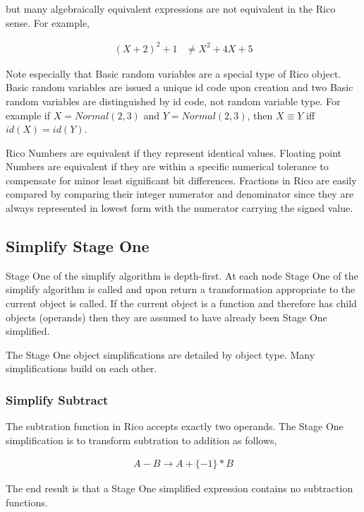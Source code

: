 but many algebraically equivalent expressions are not equivalent in the Rico sense. For example,

\begin{align*}
(X+2)^2 + 1 &\neq X^2 + 4X + 5
\end{align*}

Note especially that Basic random variables are a special type of Rico object. Basic random variables are issued a unique id code upon creation and two Basic random variables are distinguished by id code, not random variable type. For example if $X = Normal(2,3)$ and $Y = Normal(2,3)$, then $X \equiv Y$ iff $id(X) = id(Y)$. 

Rico Numbers are equivalent if they represent identical values. Floating point Numbers are equivalent if they are within a specific numerical tolerance to compensate for minor least significant bit differences. Fractions in Rico are easily compared by comparing their integer numerator and denominator since they are always represented in lowest form with the numerator carrying the signed value.

\subsection{Simplify Stage One}

Stage One of the simplify algorithm is depth-first. At each node Stage One of the simplify algorithm is called and upon return a transformation appropriate to the current object is called. If the current object is a function and therefore has child objects (operands) then they are assumed to have already been Stage One simplified.

The Stage One object simplifications are detailed by object type. Many simplifications build on each other. 

\subsubsection{Simplify Subtract}

The subtration function in Rico accepts exactly two operands. The Stage One simplification is to transform subtration to addition as follows,

\begin{align*}
A - B \rightarrow A + \{-1\}*B
\end{align*}

The end result is that a Stage One simplified expression contains no subtraction functions.

